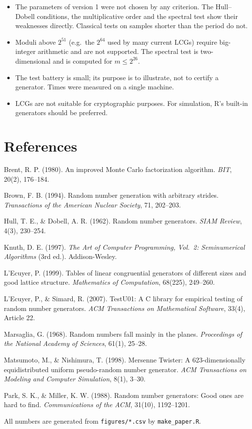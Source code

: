 \documentclass[11pt,a4paper]{article}
\begin{document}
\begin{itemize}
  \item The parameters of version 1 were not chosen by any criterion. The Hull--Dobell conditions, the multiplicative order and
  the spectral test show their weaknesses directly. Classical tests on samples shorter than the period do not.
  \item Moduli above $2^{51}$ (e.g.\ the $2^{64}$ used by many current LCGs) require big-integer arithmetic and are not
  supported. The spectral test is two-dimensional and is computed for $m \le 2^{26}$.
  \item The test battery is small; its purpose is to illustrate, not to certify a generator. Times were measured on a single
  machine.
  \item LCGs are not suitable for cryptographic purposes. For simulation, R's built-in generators should be preferred.
\end{itemize}

\section*{References}
{\small
\setlength{\parskip}{2pt}
\hangindent=1.27cm Brent, R. P. (1980). An improved Monte Carlo factorization algorithm. \textit{BIT}, 20(2), 176--184.\par
\hangindent=1.27cm Brown, F. B. (1994). Random number generation with arbitrary strides. \textit{Transactions of the American Nuclear Society}, 71, 202--203.\par
\hangindent=1.27cm Hull, T. E., \& Dobell, A. R. (1962). Random number generators. \textit{SIAM Review}, 4(3), 230--254.\par
\hangindent=1.27cm Knuth, D. E. (1997). \textit{The Art of Computer Programming, Vol.\ 2: Seminumerical Algorithms} (3rd ed.). Addison-Wesley.\par
\hangindent=1.27cm L'Ecuyer, P. (1999). Tables of linear congruential generators of different sizes and good lattice structure.
\textit{Mathematics of Computation}, 68(225), 249--260.\par
\hangindent=1.27cm L'Ecuyer, P., \& Simard, R. (2007). TestU01: A C library for empirical testing of random number generators.
\textit{ACM Transactions on Mathematical Software}, 33(4), Article 22.\par
\hangindent=1.27cm Marsaglia, G. (1968). Random numbers fall mainly in the planes. \textit{Proceedings of the National Academy of Sciences}, 61(1), 25--28.\par
\hangindent=1.27cm Matsumoto, M., \& Nishimura, T. (1998). Mersenne Twister: A 623-dimensionally equidistributed uniform pseudo-random number
generator. \textit{ACM Transactions on Modeling and Computer Simulation}, 8(1), 3--30.\par
\hangindent=1.27cm Park, S. K., \& Miller, K. W. (1988). Random number generators: Good ones are hard to find. \textit{Communications of the ACM},
31(10), 1192--1201.\par

\smallskip
All numbers are generated from
\texttt{figures/*.csv} by \texttt{make\_paper.R}.
}
\end{document}
